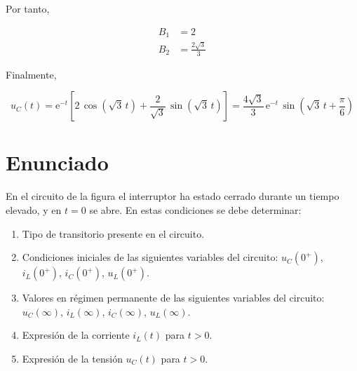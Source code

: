 Por tanto,

\begin{align*}
  B_1 &= 2\\
  B_2 &= \frac{2\sqrt{3}}{3}
\end{align*}

Finalmente,

\begin{equation*}
u_C(t)= \mathrm{e}^{-t}\left[2\,\cos(\sqrt{3}\,t)+\dfrac{2}{\sqrt{3}}\,\sin(\sqrt{3}\,t)\right]=\dfrac{4\sqrt{3}}{3}\,\mathrm{e}^{-t}\,\sin\left(\sqrt{3}\,t+\dfrac{\pi}{6}\right)
\end{equation*}


\section{Enunciado}
En el circuito de la figura el interruptor ha estado cerrado durante un tiempo elevado, y en $t = 0$ se abre. En estas condiciones se debe determinar:

\begin{enumerate}
\item Tipo de transitorio presente en el circuito.

\item Condiciones iniciales de las siguientes variables del circuito: $u_C(0^+)$, $i_L(0^+)$, $i_C(0^+)$, $u_L(0^+)$.
\item Valores en régimen permanente de las siguientes variables del circuito: $u_C(\infty)$, $i_L(\infty)$, $i_C(\infty)$, $u_L(\infty)$.
\item Expresión de la corriente $i_L(t)$ para  $t > 0$.
\item Expresión de la tensión $u_C(t)$ para  $t > 0$.
\end{enumerate}

